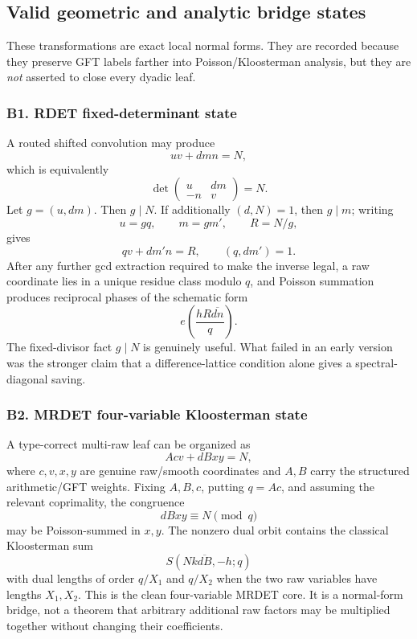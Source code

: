 \documentclass[11pt]{article}
\theoremstyle{definition}
\theoremstyle{remark}
\newcommand{\1}{\mathbf 1}
\begin{document}
\subsection{Valid geometric and analytic bridge states}

These transformations are exact local normal forms.  They are recorded because
they preserve GFT labels farther into Poisson/Kloosterman analysis, but they are
\emph{not} asserted to close every dyadic leaf.

\subsubsection*{B1. RDET fixed-determinant state}

A routed shifted convolution may produce
\begin{equation}\label{eq:tool-rdet}
 uv+dmn=N,
\end{equation}
which is equivalently
\[
 \det\begin{pmatrix}u&dm\\-n&v\end{pmatrix}=N.
\]
Let \(g=(u,dm)\).  Then \(g\mid N\).  If additionally \((d,N)=1\), then
\(g\mid m\); writing
\[
 u=gq,\qquad m=gm',\qquad R=N/g,
\]
gives
\begin{equation}\label{eq:tool-rdet-reduced}
 qv+dm'n=R,
 \qquad (q,dm')=1.
\end{equation}
After any further gcd extraction required to make the inverse legal, a raw
coordinate lies in a unique residue class modulo \(q\), and Poisson summation
produces reciprocal phases of the schematic form
\[
 e\!\left(\frac{hR\overline{dn}}{q}\right).
\]
The fixed-divisor fact \(g\mid N\) is genuinely useful.  What failed in an early
version was the stronger claim that a difference-lattice condition alone gives
a spectral-diagonal saving.

\subsubsection*{B2. MRDET four-variable Kloosterman state}

A type-correct multi-raw leaf can be organized as
\begin{equation}\label{eq:tool-mrdet}
 Acv+dBxy=N,
\end{equation}
where \(c,v,x,y\) are genuine raw/smooth coordinates and \(A,B\) carry the
structured arithmetic/GFT weights.  Fixing \(A,B,c\), putting \(q=Ac\), and
assuming the relevant coprimality, the congruence
\[
 dBxy\equiv N\pmod q
\]
may be Poisson-summed in \(x,y\).  The nonzero dual orbit contains the classical
Kloosterman sum
\begin{equation}\label{eq:tool-mrdet-kl}
 S\!\left(Nk\overline{dB},-h;q\right)
\end{equation}
with dual lengths of order \(q/X_1\) and \(q/X_2\) when the two raw variables
have lengths \(X_1,X_2\).  This is the clean four-variable MRDET core.  It is a
normal-form bridge, not a theorem that arbitrary additional raw factors may be
multiplied together without changing their coefficients.
\end{document}

